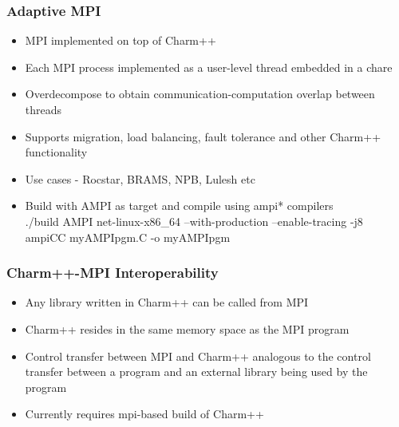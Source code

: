 \begin{frame}[fragile]

  \frametitle{Adaptive MPI}

  \begin{itemize}
    \item MPI implemented on top of Charm++ 
    \item Each MPI process implemented as a user-level thread embedded in a
    chare
    \item Overdecompose to obtain communication-computation overlap between
    threads
    \item Supports migration, load balancing, fault tolerance and other Charm++
    functionality
    \item Use cases - Rocstar, BRAMS, NPB, Lulesh etc
    \item Build with AMPI as target and compile using ampi* compilers\\
    ./build AMPI net-linux-x86\_64 --with-production --enable-tracing -j8\\
    ampiCC myAMPIpgm.C -o myAMPIpgm
  \end{itemize}
\end{frame}

\begin{frame}[fragile]

  \frametitle{Charm++-MPI Interoperability}

  \begin{itemize}
    \item Any library written in Charm++ can be called from MPI
    \item Charm++ resides in the same memory space as the MPI program
    \item Control transfer between MPI and Charm++ analogous to the control transfer
    between a program and an external library being used by the program
    \item Currently requires mpi-based build of Charm++

  \end{itemize}
\end{frame}

